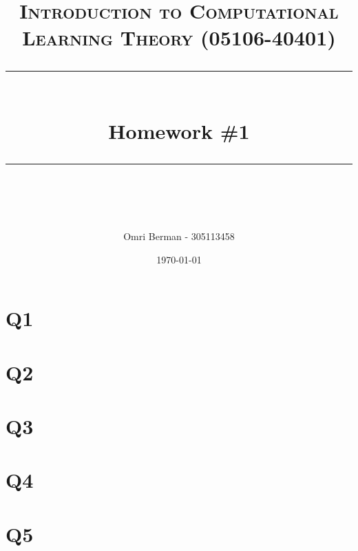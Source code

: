 \documentclass{article} %
\title{
\normalfont \normalsize 
\textsc{Introduction to Computational Learning Theory (05106-40401)} \\
[10pt] 
\rule{\linewidth}{0.5pt} \\[6pt] 
\huge Homework \#1 \\
\rule{\linewidth}{2pt}  \\[10pt]
}
\author{Omri Berman - 305113458}
\date{\normalsize \today}
\begin{document}
\maketitle
\noindent

\section*{Q1}


\section*{Q2}


\section*{Q3}


\section*{Q4}


\section*{Q5}

\end{document}
